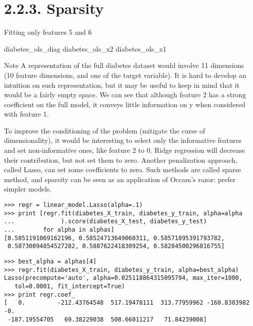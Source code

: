 \section*{2.2.3. Sparsity}

Fitting only features 5 and 6

diabetes_ols_diag diabetes_ols_x2 diabetes_ols_x1

Note A representation of the full diabetes dataset would involve 11 dimensions (10 feature dimensions, and one of the target variable). It is hard to develop an intuition on such representation, but it may be useful to keep in mind that it would be a fairly empty space.
We can see that although feature 2 has a strong coefficient on the full model, it conveys little information on y when considered with feature 1.

To improve the conditioning of the problem (mitigate the curse of dimensionality), it would be interesting to select only the informative features and set non-informative ones, like feature 2 to 0. Ridge regression will decrease their contribution, but not set them to zero. Another penalization approach, called Lasso, can set some coefficients to zero. Such methods are called sparse method, and sparsity can be seen as an application of Occam’s razor: prefer simpler models.

\begin{framed}
\begin{verbatim}
>>> regr = linear_model.Lasso(alpha=.1)
>>> print [regr.fit(diabetes_X_train, diabetes_y_train, alpha=alpha
...             ).score(diabetes_X_test, diabetes_y_test)
...        for alpha in alphas]
[0.5851191069162196, 0.58524713649060311, 0.58571895391793782, 
 0.58730094854527282, 0.5887622418309254, 0.58284500296816755]
\end{verbatim}
\end{framed}
\begin{framed}
\begin{verbatim}
>>> best_alpha = alphas[4]
>>> regr.fit(diabetes_X_train, diabetes_y_train, alpha=best_alpha)
Lasso(precompute='auto', alpha=0.025118864315095794, max_iter=1000,
   tol=0.0001, fit_intercept=True)
>>> print regr.coef_
[   0.         -212.43764548  517.19478111  313.77959962 -160.8303982    -0.
 -187.19554705   69.38229038  508.66011217   71.84239008]
\end{verbatim}
\end{framed}
 
